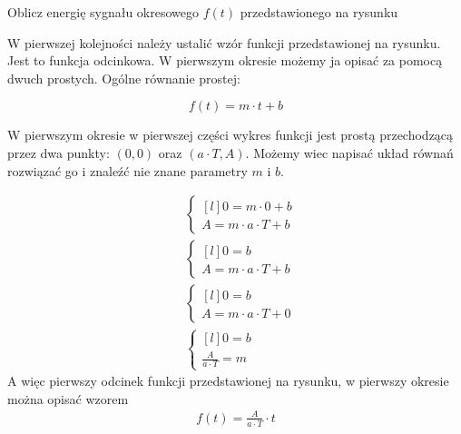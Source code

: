Oblicz energię sygnału okresowego $f(t)$ przedstawionego na rysunku 

\begin{figure}[H]
\centering
{}
\end{figure}

W pierwszej kolejności należy ustalić wzór funkcji przedstawionej na rysunku.
Jest to funkcja odcinkowa. W pierwszym okresie możemy ja opisać za pomocą dwuch prostych. Ogólne równanie prostej:

\begin{equation}
f(t) = m \cdot t + b
\end{equation}

 W pierwszym okresie w pierwszej części wykres funkcji jest prostą przechodzącą przez dwa punkty: $(0,0)$ oraz $(a\cdot T,A)$. Możemy wiec napisać układ równań rozwiązać go i znaleźć nie znane parametry $m$ i $b$.  

\begin{align*}
&\left\{\begin{matrix*}[l]
0 = m\cdot 0 +b\\ 
A = m\cdot a \cdot T +b
\end{matrix*}\right. \\
&\left\{\begin{matrix*}[l]
0 = b\\ 
A = m \cdot a\cdot T +b
\end{matrix*}\right. \\
&\left\{\begin{matrix*}[l]
0 = b\\ 
A = m \cdot a\cdot T +0
\end{matrix*}\right. \\
&\left\{\begin{matrix*}[l]
0 = b\\ 
\frac{A}{a\cdot T} = m
\end{matrix*}\right.
\end{align*}
A więc pierwszy odcinek funkcji przedstawionej na rysunku, w pierwszy okresie można opisać wzorem
\begin{align*}
f(t) = \frac{A}{a \cdot T}\cdot t
\end{align*}

